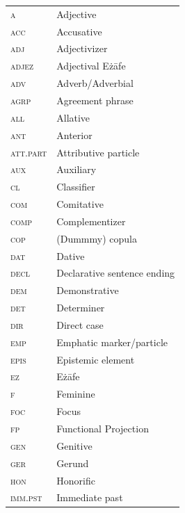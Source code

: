 \addchap{\lsAbbreviationsTitle}


\begin{tabularx}{.45\textwidth}{@{}lQ}
\textsc{a} & Adjective\\
\textsc{acc} & Accusative\\
\textsc{adj} & Adjectivizer\\
\textsc{adjez} & Adjectival E{\.z}āfe\\
\textsc{adv} & Adverb/Adverbial\\
\textsc{agrp} & Agreement phrase\\
\textsc{all} & Allative\\
\textsc{ant} & Anterior\\
\textsc{att.part} & Attributive particle\\
\textsc{aux} & Auxiliary\\
\textsc{cl} & Classifier\\
\textsc{com} & Comitative\\
\textsc{comp} & Complementizer\\
\textsc{cop} & (Dummmy) copula\\
\textsc{dat} & Dative\\
\textsc{decl} & Declarative sentence ending\\
\textsc{dem} & Demonstrative\\
\textsc{det} & Determiner\\
\textsc{dir} & Direct case\\
\textsc{emp} & Emphatic marker/particle\\
\textsc{epis} & Epistemic element\\
\textsc{ez} & E{\.z}āfe\\
\textsc{f} & Feminine\\
\textsc{foc} & Focus\\
\textsc{fp} & Functional Projection\\
\textsc{gen} & Genitive\\
\textsc{ger} & Gerund\\
\textsc{hon} & Honorific\\
\textsc{imm.pst} & Immediate past\\
\end{tabularx}
